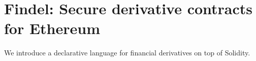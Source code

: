 \chapter{Findel: Secure derivative contracts for Ethereum}

\label{Chapter10_Findel}

We introduce a declarative language for financial derivatives on top of Solidity.